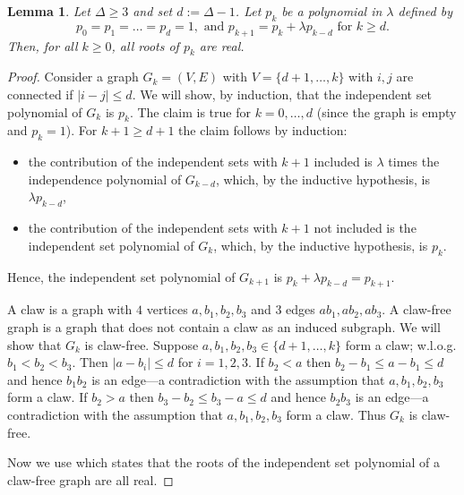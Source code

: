 \documentclass[11pt]{article}
\newtheorem{lemma}[theorem]{Lemma}
\begin{document}
\begin{lemma}\label{lele1}
Let $\Delta\geq 3$ and set $d:=\Delta-1$. Let $p_k$ be a polynomial in $\lambda$ defined by
\begin{equation*}
p_0=p_1=\dots=p_d=1, \mbox{ and } p_{k+1} = p_k + \lambda p_{k-d} \mbox{\ \ for $k\geq d$}.
\end{equation*}
Then, for all $k\geq 0$, all roots of $p_k$ are real.
\end{lemma}
\begin{proof}
Consider a graph $G_k=(V,E)$ with $V=\{d+1,\dots,k\}$ with $i,j$ are connected if $|i-j|\leq d$.
We will show, by induction, that the independent set polynomial of $G_k$ is $p_k$. The claim is true
for $k=0,\dots,d$ (since the graph is empty and $p_k=1$). For $k+1\geq d+1$ the claim follows by induction:
\begin{itemize}
\item the contribution of the independent sets with $k+1$ included is $\lambda$ times the independence polynomial
of $G_{k-d}$, which, by the inductive hypothesis, is $\lambda p_{k-d}$,
\item the contribution of the independent sets with $k+1$ not included is the independent set polynomial of $G_{k}$,
which, by the inductive hypothesis, is $p_{k}$.
\end{itemize}
Hence, the independent set polynomial of $G_{k+1}$ is $p_{k}+\lambda p_{k-d}=p_{k+1}$.

A claw is a graph with $4$ vertices $a,b_1,b_2,b_3$ and $3$ edges $ab_1,ab_2,ab_3$. A claw-free graph is a graph
that does not contain a claw as an induced subgraph. We will show that $G_k$ is claw-free.
Suppose $a,b_1,b_2,b_3\in\{d+1,\dots,k\}$ form a claw; w.l.o.g. $b_1<b_2<b_3$. Then $|a-b_i|\leq d$ for $i=1,2,3$.
If $b_2<a$ then $b_2-b_1\leq a-b_1\leq d$ and hence $b_1b_2$ is an edge---a contradiction with the
assumption that $a,b_1,b_2,b_3$ form a claw. If $b_2>a$ then $b_3-b_2\leq b_3-a\leq d$ and hence $b_2b_3$ is an edge---a contradiction with the
assumption that $a,b_1,b_2,b_3$ form a claw. Thus $G_k$ is claw-free.

Now we use \cite[Theorem 1.1]{DBLP:journals/jct/ChudnovskyS07} which states that the roots of
the independent set polynomial of a claw-free graph are all real.
\end{proof}
\end{document}
